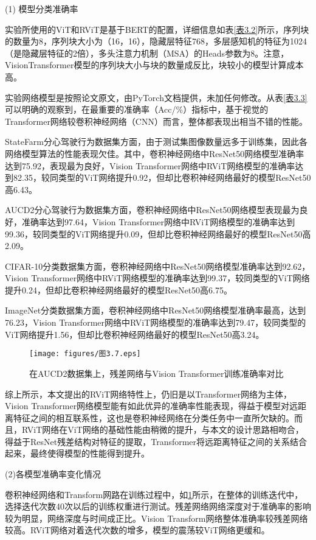 (1)	模型分类准确率

实验所使用的ViT和RViT是基于BERT\cite{56}的配置，详细信息如表\ref{表3.2}所示，序列块的数量为8，序列块大小为（16，16），隐藏层特征768，多层感知机的特征为1024（是隐藏层特征的2倍），多头注意力机制（MSA）的Heads参数为8。注意，VisionTransformer模型的序列块大小与块的数量成反比，块较小的模型计算成本高。

实验网络模型是按照论文原文，由PyTorch文档提供，未加任何修改。从表\ref{表3.3}可以明确的观察到，在最重要的准确率（Acc/\%）指标中，基于视觉的Transformer网络较卷积神经网络（CNN）而言，整体都表现出相当不错的性能。

StateFarm分心驾驶行为数据集方面，由于测试集图像数量远多于训练集，因此各网络模型算法的性能表现欠佳。其中，卷积神经网络中ResNet50网络模型准确率达到75.92，表现最为良好，Vision Transformer网络中RViT网络模型的准确率达到82.35，较同类型的ViT网络提升0.92，但却比卷积神经网络最好的模型ResNet50高6.43。

AUCD2分心驾驶行为数据集方面，卷积神经网络中ResNet50网络模型表现最为良好，准确率达到97.64，Vision Transformer网络中RViT网络模型的准确率达到99.36，较同类型的ViT网络提升0.09，但却比卷积神经网络最好的模型ResNet50高2.09。

CIFAR-10分类数据集方面，卷积神经网络中ResNet50网络模型准确率达到92.62，Vision Transformer网络中RViT网络模型的准确率达到99.37，较同类型的ViT网络提升0.24，但却比卷积神经网络最好的模型ResNet50高6.75。

ImageNet分类数据集方面，卷积神经网络中ResNet50网络模型准确率最高，达到76.23，Vision Transformer网络中RViT网络模型的准确率达到79.47，较同类型的ViT网络提升1.56，但却比卷积神经网络最好的模型ResNet50高3.24。

\begin{figure}[!ht]
	\centering
	\texttt{[image: figures/图3.7.eps]}
	\caption{在AUCD2数据集上，残差网络与Vision Transformer训练准确率对比}\label{图3.7}
\end{figure}

综上所示，本文提出的RViT网络特性上，仍旧是以Transformer网络为主体，Vision Transformer网络模型能有如此优异的准确率性能表现，得益于模型对远距离特征之间的相互联系性，这也是卷积神经网络在分类任务中一直所欠缺的。而且，RViT网络在ViT网络的基础性能由稍微的提升，与本文的设计思路相吻合，得益于ResNet残差结构对特征的提取，Transformer将远距离特征之间的关系结合起来，最终使得模型的性能得到提升。

(2)各模型准确率变化情况

卷积神经网络和Transform网路在训练过程中，如\ref{图3.7}所示，在整体的训练迭代中，选择迭代次数40次以后的训练权重进行测试。残差网络网络深度对于准确率的影响较为明显，网络深度与时间成正比。Vision Transform网络整体准确率较残差网络较高。RViT网络对着迭代次数的增多，模型的震荡较ViT网络更缓和。


